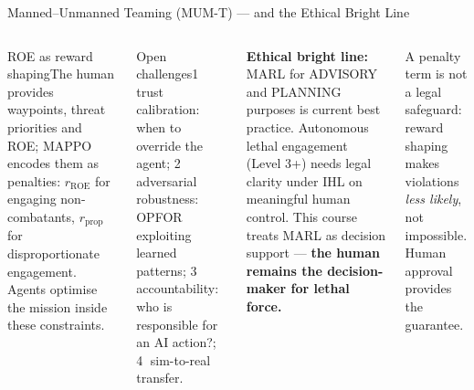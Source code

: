 \documentclass[aspectratio=169,10pt,t]{beamer}
\begin{document}
\begin{frame}{Manned--Unmanned Teaming (MUM-T) --- and the Ethical Bright Line}
\begin{columns}[T]
\begin{cbox}[ISSAnavy]{ROE as reward shaping}\scriptsize The human provides waypoints, threat priorities and ROE; MAPPO encodes them as penalties: $r_{\text{ROE}}$ for engaging non-combatants, $r_{\text{prop}}$ for disproportionate engagement. Agents optimise the mission inside these constraints.\end{cbox}
\begin{cbox}[ISSAamb]{Open challenges}\scriptsize \textcircled{\tiny1} trust calibration: when to override the agent; \textcircled{\tiny2} adversarial robustness: OPFOR exploiting learned patterns; \textcircled{\tiny3} accountability: who is responsible for an AI action?; \textcircled{\tiny4} sim-to-real transfer.\end{cbox}
\begin{wbox}\scriptsize\textbf{Ethical bright line:} MARL for ADVISORY and PLANNING purposes is current best practice. Autonomous lethal engagement (Level 3+) needs legal clarity under IHL on meaningful human control. This course treats MARL as decision support --- \textbf{the human remains the decision-maker for lethal force.}\end{wbox}
\begin{ibox}\scriptsize A penalty term is not a legal safeguard: reward shaping makes violations \emph{less likely}, not impossible. Human approval provides the guarantee.\end{ibox}
\end{columns}
\end{frame}
\end{document}

